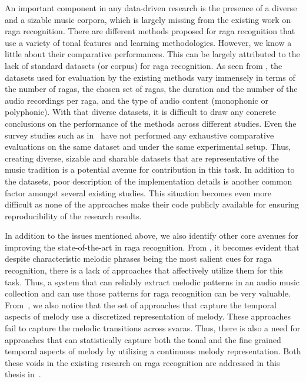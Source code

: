 An important component in any data-driven research is the presence of a diverse and a sizable music corpora, which is largely missing from the existing work on \gls{raga} recognition. There are different methods proposed for \gls{raga} recognition that use a variety of tonal features and learning methodologies. However, we know a little about their comparative performances. This can be largely attributed to the lack of standard datasets (or corpus) for \gls{raga} recognition. As seen from , the datasets used for evaluation by the existing methods vary immensely in terms of the number of \glspl{raga}, the chosen set of \glspl{raga}, the duration and the number of the audio recordings per \gls{raga}, and the type of audio content (monophonic or polyphonic). With that diverse datasets, it is difficult to draw any concrete conclusions on the performance of the methods across different studies. Even the survey studies such as in~\cite{koduri2011survey} have not performed any exhaustive comparative evaluations on the same dataset and under the same experimental setup. Thus, creating diverse, sizable and sharable datasets that are representative of the music tradition is a potential avenue for contribution in this task. In addition to the datasets, poor description of the implementation details is another common factor amongst several existing studies. This situation becomes even more difficult as none of the approaches make their code publicly available for ensuring reproducibility of the research results. 


In addition to the issues mentioned above, we also identify other core avenues for improving the state-of-the-art in \gls{raga} recognition. From , it becomes evident that despite characteristic melodic phrases being the most salient cues for \gls{raga} recognition, there is a lack of approaches that affectively utilize them for this task. Thus, a system that can reliably extract melodic patterns in an audio music collection and can use those patterns for \gls{raga} recognition can be very valuable. From~, we also notice that the set of approaches that capture the temporal aspects of melody use a discretized representation of melody. These approaches fail to capture the melodic transitions across \glspl{svara}. Thus, there is also a need for approaches that can statistically capture both the tonal and the fine grained temporal aspects of melody by utilizing a continuous melody representation. Both these voids in the existing research on \gls{raga} recognition are addressed in this thesis in~.


